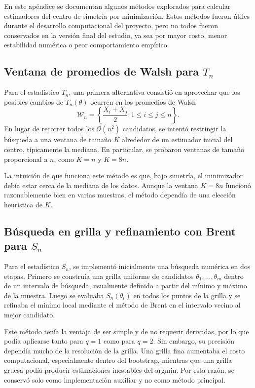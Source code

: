 

\label{ap:argmin-descartados}

En este apéndice se documentan algunos métodos explorados para calcular estimadores del centro de simetría por minimización. Estos métodos fueron útiles durante el desarrollo computacional del proyecto, pero no todos fueron conservados en la versión final del estudio, ya sea por mayor costo, menor estabilidad numérica o peor comportamiento empírico.

\subsection*{Ventana de promedios de Walsh para \texorpdfstring{$T_n$}{Tn}}

Para el estadístico \(T_n\), una primera alternativa consistió en aprovechar que los posibles cambios de \(T_n(\theta)\) ocurren en los promedios de Walsh
\[
\mathcal W_n=\left\{\frac{X_i+X_j}{2}:1\le i\le j\le n\right\}.
\]
En lugar de recorrer todos los \(\mathcal O(n^2)\) candidatos, se intentó restringir la búsqueda a una ventana de tamaño \(K\) alrededor de un estimador inicial del centro, típicamente la mediana. En particular, se probaron ventanas de tamaño proporcional a \(n\), como \(K=n\) y \(K=8n\).

La intuición de que funciona este método es que, bajo simetría, el minimizador debía estar cerca de la mediana de los datos. Aunque la ventana \(K=8n\) funcionó razonablemente bien en varias muestras, el método dependía de una elección heurística de \(K\).

\subsection*{Búsqueda en grilla y refinamiento con Brent para \texorpdfstring{$S_n$}{Sn}}

Para el estadístico \(S_n\), se implementó inicialmente una búsqueda numérica en dos etapas. Primero se construía una grilla uniforme de candidatos \(\theta_1,\dots,\theta_m\) dentro de un intervalo de búsqueda, usualmente definido a partir del mínimo y máximo de la muestra. Luego se evaluaba \(S_n(\theta_i)\) en todos los puntos de la grilla y se refinaba el mínimo local mediante el método de Brent en el intervalo vecino al mejor candidato.

Este método tenía la ventaja de ser simple y de no requerir derivadas, por lo que podía aplicarse tanto para \(q=1\) como para \(q=2\). Sin embargo, su precisión dependía mucho de la resolución de la grilla. Una grilla fina aumentaba el costo computacional, especialmente dentro del bootstrap, mientras que una grilla gruesa podía producir estimaciones inestables del argmin. Por esta razón, se conservó solo como implementación auxiliar y no como método principal.

